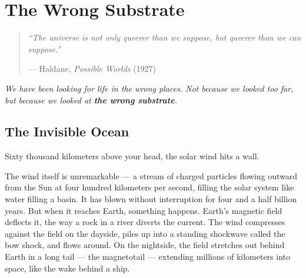 
\chapter{The Wrong Substrate}
\label{pos32:the-wrong-substrate}

\begin{quote}\small\textit{%
``The universe is not only queerer than we suppose, but queerer than we can suppose.''%
}\par\raggedleft --- Haldane, \textit{Possible Worlds} (1927)\end{quote}

\vspace{0.5cm}


\noindent\textit{We have been looking for life in the wrong places. Not because we looked too far, but because we looked at \textbf{the wrong substrate}.}


\section*{The Invisible Ocean}
\label{pos32:the-invisible-ocean}

Sixty thousand kilometers above your head, the solar wind hits a wall.

The wind itself is unremarkable --- a stream of charged particles flowing outward from the Sun at four hundred kilometers per second, filling the solar system like water filling a basin. It has blown without interruption for four and a half billion years. But when it reaches Earth, something happens. Earth's magnetic field deflects it, the way a rock in a river diverts the current. The wind compresses against the field on the dayside, piles up into a standing shockwave called the bow shock, and flows around. On the nightside, the field stretches out behind Earth in a long tail --- the magnetotail --- extending millions of kilometers into space, like the wake behind a ship.

